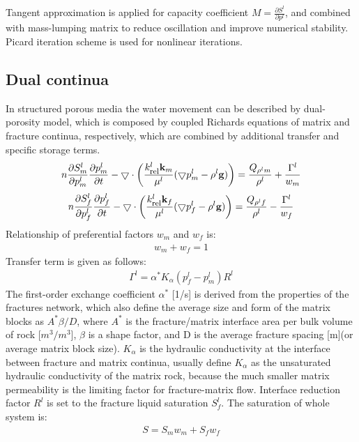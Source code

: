 Tangent approximation is applied for capacity coefficient
$M=\frac{\partial S^l}{\partial p^l}$, and combined with
mass-lumping matrix to reduce oscillation and improve numerical
stability. Picard iteration scheme is used for nonlinear iterations. \\

\subsection{Dual continua}
In structured porous media the water movement can be described by
dual-porosity model, which is composed by coupled Richards
equations of matrix and fracture continua, respectively, which are
combined by additional transfer and specific storage terms.\\
\begin{eqnarray}\label{eqn:pbased_m}
n\frac{\partial S^l_m}{\partial p^l_m}\frac{\partial
p^l_m}{\partial t}-\bigtriangledown\cdot\bigg(\frac{k_{\mbox{\footnotesize rel}}
^l\mathbf{k}_m}{\mu^l}(\bigtriangledown
p^l_m-\rho^l\mathbf{g})\bigg)=\frac{Q_{\rho^lm}}
{\rho^l}+\frac{\Gamma^l}{w_m}
\end{eqnarray}
\begin{eqnarray}\label{eqn:pbased_f}
n\frac{\partial S^l_f}{\partial p^l_f}\frac{\partial
p^l_f}{\partial t}-\bigtriangledown\cdot\bigg(\frac{k_{\mbox{\footnotesize rel}}
^l\mathbf{k}_f}{\mu^l}(\bigtriangledown
p^l_f-\rho^l\mathbf{g})\bigg)=\frac{Q_{\rho^lf}}
{\rho^l}-\frac{\Gamma^l}{w_f}
\end{eqnarray}
Relationship of preferential factors $w_m$ and $w_f$ is:
\begin{eqnarray}
w_m+w_f = 1
\end{eqnarray}
Transfer term is given as follows:
\begin{eqnarray}\label{eqn:pbased}
\Gamma^l =\alpha^\ast K_{\alpha}(p^l_f-p^l_m)R^l
\end{eqnarray}
The first-order exchange coefficient $\alpha^\ast$ [1/s] is
derived from the properties of the fractures network, which also
define the average size and form of the matrix blocks as $A^\ast
\beta/D$, where $A^\ast$ is the fracture/matrix interface area per
bulk volume of rock [$m^3/m^3$], $\beta$ is a shape factor, and D
is the average fracture spacing [m](or average matrix block size).
$K_{\alpha}$ is the hydraulic conductivity at the interface
between fracture and matrix continua, usually define $K_{\alpha}$
as the unsaturated hydraulic conductivity of the matrix rock,
because the much smaller matrix permeability is the limiting
factor for fracture-matrix flow. Interface reduction factor $R^l$
is set to the fracture liquid saturation $S^l_f$. The saturation
of whole system is:
\begin{eqnarray}
S=S_mw_m+S_fw_f
\end{eqnarray}\\
